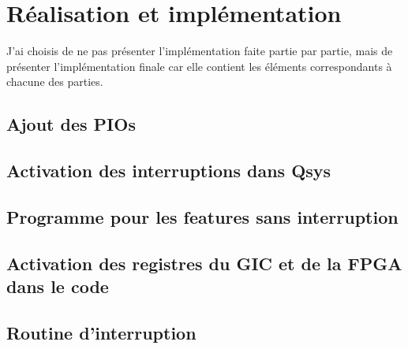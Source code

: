 \section{Réalisation et implémentation}

J'ai choisis de ne pas présenter l'implémentation faite partie par partie, mais de présenter l'implémentation finale car elle contient les éléments correspondants à chacune des parties. 

\subsection{Ajout des PIOs}

\subsection{Activation des interruptions dans Qsys}

\subsection{Programme pour les features sans interruption}

\subsection{Activation des registres du GIC et de la FPGA dans le code }

\subsection{Routine d'interruption}
 